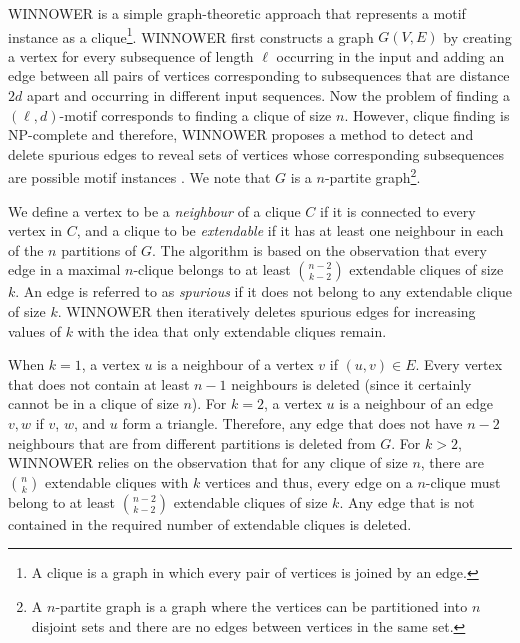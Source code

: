 WINNOWER is a simple graph-theoretic approach that represents a motif instance as a clique\footnote{A clique is a graph in which every pair of vertices is joined by an edge.}. WINNOWER first constructs a graph $G(V, E)$ by creating a vertex for every subsequence of length $\ell$ occurring in the input and adding an edge between all pairs of vertices corresponding to subsequences that are distance $2d$ apart and occurring in different input sequences. Now the problem of finding a $(\ell, d)$-motif corresponds to finding a clique of size $n$.  However, clique finding is NP-complete \cite{GJ} and therefore, WINNOWER proposes a method to detect and delete spurious edges to reveal sets of vertices whose corresponding subsequences are possible motif instances \cite{PS00}.    We note that $G$ is a $n$-partite graph\footnote{A $n$-partite graph is a graph where the vertices can be partitioned into $n$ disjoint sets and there are no edges between vertices in the same set.}. 

We define a vertex to be a {\em neighbour} of a clique $C$ if it is connected to every vertex in $C$, and a clique to be {\em extendable} if it has at least one neighbour in each of the $n$ partitions of $G$.  The algorithm is based on the observation that every edge in a maximal $n$-clique belongs to at least ${n-2}\choose{k - 2}$ extendable cliques of size $k$.  An edge is referred to as {\em spurious} if it does not belong to any extendable clique of size $k$.  WINNOWER then iteratively deletes spurious edges for increasing values of $k$ with the idea that only extendable cliques remain.

When $k = 1$, a vertex $u$ is a neighbour of a vertex $v$	if $(u, v) \in E$.  Every vertex that does not contain at least $n - 1$ neighbours is deleted (since it certainly cannot be in a clique of size $n$).  For $k = 2$, a vertex $u$ is a neighbour of an edge $v, w$ if $v$, $w$, and $u$ form a triangle.  Therefore, any edge that does not have $n - 2$  neighbours that are from different partitions is deleted from $G$.  For $k > 2$, WINNOWER relies on the observation that for any clique of size $n$, there are $n \choose k$ extendable cliques with $k$ vertices and thus, every edge on a $n$-clique must belong to at least ${n - 2}\choose{k - 2}$ extendable cliques of size $k$.  Any edge that is not contained in the required number of extendable cliques is deleted.  

